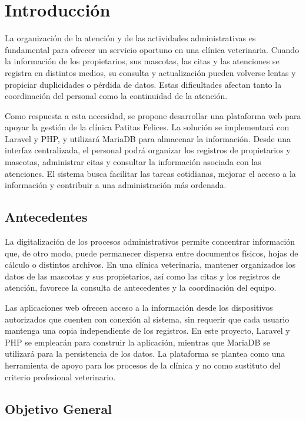 \chapter{Introducción}

La organización de la atención y de las actividades administrativas es fundamental para ofrecer un servicio oportuno en una clínica veterinaria. Cuando la información de los propietarios, sus mascotas, las citas y las atenciones se registra en distintos medios, su consulta y actualización pueden volverse lentas y propiciar duplicidades o pérdida de datos. Estas dificultades afectan tanto la coordinación del personal como la continuidad de la atención.

Como respuesta a esta necesidad, se propone desarrollar una plataforma web para apoyar la gestión de la clínica Patitas Felices. La solución se implementará con Laravel y PHP, y utilizará MariaDB para almacenar la información. Desde una interfaz centralizada, el personal podrá organizar los registros de propietarios y mascotas, administrar citas y consultar la información asociada con las atenciones. El sistema busca facilitar las tareas cotidianas, mejorar el acceso a la información y contribuir a una administración más ordenada.

\section{Antecedentes}

La digitalización de los procesos administrativos permite concentrar información que, de otro modo, puede permanecer dispersa entre documentos físicos, hojas de cálculo o distintos archivos. En una clínica veterinaria, mantener organizados los datos de las mascotas y sus propietarios, así como las citas y los registros de atención, favorece la consulta de antecedentes y la coordinación del equipo.

Las aplicaciones web ofrecen acceso a la información desde los dispositivos autorizados que cuenten con conexión al sistema, sin requerir que cada usuario mantenga una copia independiente de los registros. En este proyecto, Laravel y PHP se emplearán para construir la aplicación, mientras que MariaDB se utilizará para la persistencia de los datos. La plataforma se plantea como una herramienta de apoyo para los procesos de la clínica y no como sustituto del criterio profesional veterinario.

\section{Objetivo General}

